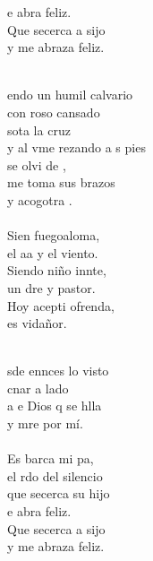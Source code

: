 \begin{cancion}
\begin{chorus}
	e abra feliz.\\
	Que secerca a sijo\\
y me abraza feliz.\\
	\end{chorus}%
	\jump\\
	endo un humil calvario\\
	con roso cansado\\
	sota la cruz\\
	y al vme rezando a s pies\\
	se olvi de ,\\
	me toma  sus brazos\\
	y acogotra .\\
\jump\\
	Sien fuegoaloma,\\
	el aa y el viento.\\
	Siendo niño innte,\\
	un dre y pastor.\\
	Hoy acepti ofrenda,\\
	es  vidañor.\\\jump\\
	\begin{chorus}%
	sde ennces lo  visto\\
	cnar a  lado\\
	a e Dios q se hlla\\
	y mre por mí.\\
\jump\\
	Es  barca  mi pa,\\
	el rdo del silencio\\
	que secerca su hijo\\
	e abra feliz.\\
	Que secerca a sijo\\
y me abraza feliz.\\
	\end{chorus}%

\end{cancion}
